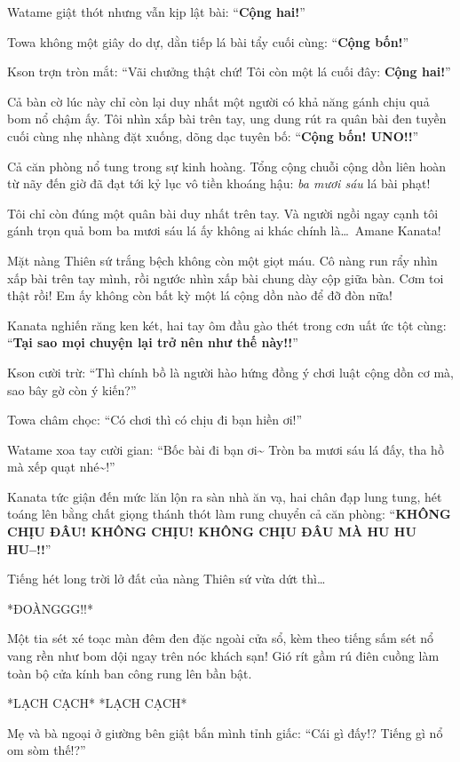 \documentclass[../main.tex]{subfiles}
\begin{document}
Watame giật thót nhưng vẫn kịp lật bài: ``\textbf{Cộng hai!}''

Towa không một giây do dự, dằn tiếp lá bài tẩy cuối cùng: ``\textbf{Cộng bốn!}''

Kson trợn tròn mắt: ``Vãi chưởng thật chứ! Tôi còn một lá cuối đây: \textbf{Cộng hai!}''

Cả bàn cờ lúc này chỉ còn lại duy nhất một người có khả năng gánh chịu quả bom nổ chậm ấy. Tôi nhìn xấp bài trên tay, ung dung rút ra quân bài đen tuyền cuối cùng nhẹ nhàng đặt xuống, dõng dạc tuyên bố: ``\textbf{Cộng bốn! UNO!!}''

Cả căn phòng nổ tung trong sự kinh hoàng. Tổng cộng chuỗi cộng dồn liên hoàn từ nãy đến giờ đã đạt tới kỷ lục vô tiền khoáng hậu: \emph{ba mươi sáu} lá bài phạt!

Tôi chỉ còn đúng một quân bài duy nhất trên tay. Và người ngồi ngay cạnh tôi gánh trọn quả bom ba mươi sáu lá ấy không ai khác chính là\dots\ Amane Kanata!

Mặt nàng Thiên sứ trắng bệch không còn một giọt máu. Cô nàng run rẩy nhìn xấp bài trên tay mình, rồi ngước nhìn xấp bài chung dày cộp giữa bàn. Cơm toi thật rồi! Em ấy không còn bất kỳ một lá cộng dồn nào để đỡ đòn nữa!

Kanata nghiến răng ken két, hai tay ôm đầu gào thét trong cơn uất ức tột cùng: ``\textbf{Tại sao mọi chuyện lại trở nên như thế này!!}''

Kson cười trừ: ``Thì chính bồ là người hào hứng đồng ý chơi luật cộng dồn cơ mà, sao bây gờ còn ý kiến?''

Towa châm chọc: ``Có chơi thì có chịu đi bạn hiền ơi!''

Watame xoa tay cười gian: ``Bốc bài đi bạn ơi\~{} Tròn ba mươi sáu lá đấy, tha hồ mà xếp quạt nhé\~{}!''

Kanata tức giận đến mức lăn lộn ra sàn nhà ăn vạ, hai chân đạp lung tung, hét toáng lên bằng chất giọng thánh thót làm rung chuyển cả căn phòng: ``\textbf{KHÔNG CHỊU ĐÂU! KHÔNG CHỊU! KHÔNG CHỊU ĐÂU MÀ HU HU HU--!!}''

Tiếng hét long trời lở đất của nàng Thiên sứ vừa dứt thì\dots

*ĐOÀNGGG!!*

Một tia sét xé toạc màn đêm đen đặc ngoài cửa sổ, kèm theo tiếng sấm sét nổ vang rền như bom dội ngay trên nóc khách sạn! Gió rít gầm rú điên cuồng làm toàn bộ cửa kính ban công rung lên bần bật.

*LẠCH CẠCH* *LẠCH CẠCH*

Mẹ và bà ngoại ở giường bên giật bắn mình tỉnh giấc: ``Cái gì đấy!? Tiếng gì nổ om sòm thế!?''
\end{document}
